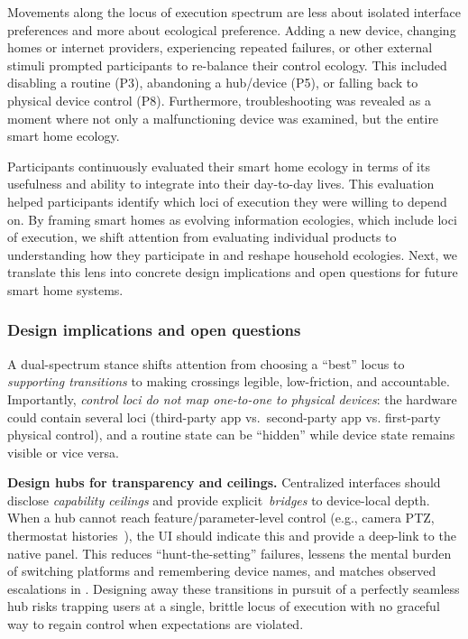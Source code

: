 Movements along the locus of execution spectrum are less about isolated interface preferences and more about ecological preference. Adding a new device, changing homes or internet providers, experiencing repeated failures, or other external stimuli prompted participants to re-balance their control ecology. This included disabling a routine (P3), abandoning a hub/device (P5), or falling back to physical device control (P8). Furthermore, troubleshooting was revealed as a moment where not only a malfunctioning device was examined, but the entire smart home ecology. 

Participants continuously evaluated their smart home ecology in terms of its usefulness and ability to integrate into their day-to-day lives. This evaluation helped participants identify which loci of execution they were willing to depend on. By framing smart homes as evolving information ecologies, which include loci of execution, we shift attention from evaluating individual products to understanding how they participate in and reshape household ecologies. Next, we translate this lens into concrete design implications and open questions for future smart home systems. 

\subsubsection{Design implications and open questions}
\label{cic:sec:implications_future}
A dual-spectrum stance shifts attention from choosing a ``best'' locus to \emph{supporting transitions} to making crossings legible, low-friction, and accountable. 
Importantly, \emph{control loci do not map one-to-one to physical devices}: the hardware could contain several loci (third-party app vs.\ second-party app vs. first-party physical control), and a routine state can be ``hidden'' while device state remains visible or vice versa.

\noindent\textbf{Design hubs for transparency and ceilings.}
Centralized interfaces should disclose \emph{capability ceilings} and provide explicit~\emph{bridges} to device-local depth. When a hub cannot reach feature/parameter-level control (e.g., camera PTZ, thermostat histories~\cite{stopps2021anyone}), the UI should indicate this and provide a deep-link to the native panel. 
This reduces ``hunt-the-setting'' failures, lessens the mental burden of switching platforms and remembering device names, and matches observed escalations in . Designing away these transitions in pursuit of a perfectly seamless hub risks trapping users at a single, brittle locus of execution with no graceful way to regain control when expectations are violated.

